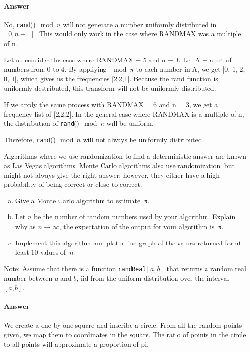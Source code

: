 \documentclass{article}
\begin{document}

\paragraph{Answer}
No, \texttt{rand}()$\mod n$ will not generate a number uniformly distributed in
$[0,n-1]$. This would only work in the case where RANDMAX was a multiple of n.

Let us consider the case where RANDMAX = 5 and n = 3. Let A = a set of numbers from
0 to 4. By appliying $\mod n$ to each number in A, we get [0, 1, 2, 0, 1], which
gives us the frequencies [2,2,1]. Because the rand function is uniformly destributed,
this transform will not be uniformly distributed.

If we apply the same process with RANDMAX = 6 and n = 3, we get a frequency list of
[2,2,2]. In the general case where RANDMAX is a multiple of n, the distribution of
\texttt{rand}()$\mod n$ will be uniform.

Therefore, \texttt{rand}()$\mod n$ will not always be uniformly distributed.



\collab{}
\nextprob{}

Algorithms where we use randomization to find a deterministic answer are known
as Las Vegas algorithms.  Monte Carlo algorithms also use randomization, but
might not always give the right answer; however, they either have a high
probability of being correct or close to correct.

\begin{enumerate}[(a)]
    \item Give a Monte Carlo algorithm to estimate~$\pi$.
    \item Let $n$ be the number of random numbers used by your algorithm.
        Explain why as $n \to \infty$, the expectation of the output for your
        algorithm is~$\pi$.
    \item Implement this algorithm and plot a line graph of
        the values returned for at least $10$ values of~$n$.
\end{enumerate}

Note: Assume that there is a function \texttt{randReal}$[a,b]$ that returns a random
real number between $a$ and $b$, iid from the uniform distribution over the
interval $[a,b]$.

\paragraph{Answer}
We create a one by one square and inscribe a circle. From all the random points
given, we map them to coordinates in the square. The ratio of points in the circle
to all points will approximate a proportion of pi.
\end{document}
